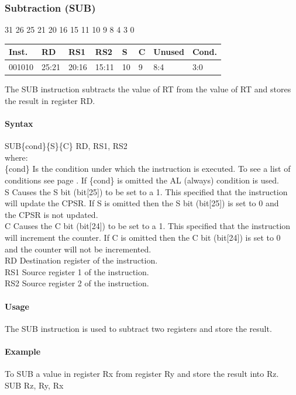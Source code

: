 \documentclass[12pt]{article}
\newcommand{\aTypeInstruction}[6]
{%
    \hspace{1.6cm}31 \hspace{1.15cm}26 \hspace{.04cm}25 \hspace{.8cm}21 \hspace{.04cm}20 \hspace{.8cm}16 \hspace{.04cm}15 \hspace{.8cm}11 \hspace{.04cm}10 \hspace{.275cm}9 \hspace{.275cm}8 \hspace{1.175cm}4 \hspace{.04cm}3 \hspace{1.25cm}0
    \vspace{-.25cm}
    \begin{center}
        \begin{tabular}{ |p{1.8cm}|p{1.5cm}|p{1.5cm}|p{1.5cm}|p{0.3cm}|p{0.3cm}|p{1.5cm}|p{1.5cm}| }
            \hline
            \textbf{Inst.} & \textbf{RD}& \textbf{RS1} & \textbf{RS2} & \textbf{S} & \textbf{C} & Unused & \textbf{Cond.}\\
            \hline
            #1 & 25:21 & 20:16 & 15:11 & 10 & 9 & 8:4 &3:0\\
            \hline
        \end{tabular}
    \end{center}
    
    \noindent
    #2\\
    
    \paragraph{Syntax}
    \begin{flushleft}
    #3\{cond\}\{S\}\{C\} RD, RS1, RS2\\
    \vspace{1em}        %
    where:\\
    \vspace{1em}
    \{cond\}    \hspace{2em} Is the condition under which the instruction is executed. To see a list of\\
                \hspace{5.4em} conditions see page . If \{cond\} is omitted the AL (always) condition is used.\\
    \vspace{1em}    
    S       \hspace{4.5em} Causes the S bit (bit[25]) to be set to a 1. This specified that the instruction\\
            \hspace{5.4em} will update the CPSR. If S is omitted then the S bit (bit[25]) is set to 0 and\\
            \hspace{5.4em} the CPSR is not updated.\\
    \vspace{1em}    
    C       \hspace{4.5em} Causes the C bit (bit[24]) to be set to a 1. This specified that the instruction\\
            \hspace{5.4em} will increment the counter. If C is omitted then the C bit (bit[24]) is set to 0\\
            \hspace{5.4em} and the counter will not be incremented.\\
    \vspace{1em}
    RD  \hspace{3.6em} Destination register of the instruction.\\
    \vspace{1em}
    RS1  \hspace{3.35em} Source register 1 of the instruction.\\
    \vspace{1em}
    RS2  \hspace{3.35em} Source register 2 of the instruction.\\
    \end{flushleft}
    
    \paragraph{Usage}
    \begin{flushleft}
    #4\\
    \end{flushleft}
    \paragraph{Example}
    \begin{flushleft}
    #5\\
    \vspace{1em}
    #6
    \end{flushleft}
    }
\begin{document}
   
   




    \newpage
    \subsubsection{Subtraction (SUB)}
    
    \aTypeInstruction
    {001010}
    {The SUB instruction subtracts the value of RT from the value of RT and stores the result in register RD.}
    {SUB}
    {The SUB instruction is used to subtract two registers and store the result.}
    {To SUB a value in register Rx from register Ry and store the result into Rz.}
    {SUB Rz, Ry, Rx}
    
    
\end{document}
